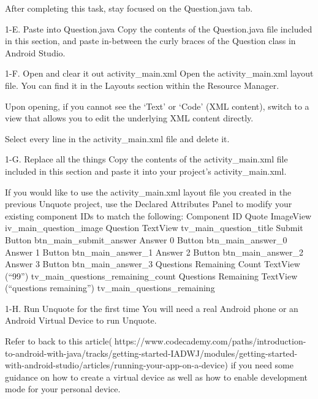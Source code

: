                 After completing this task, stay focused on the Question.java tab.

        1-E. Paste into Question.java
                Copy the contents of the Question.java file included in this section, and paste in-between the curly braces of the Question class in Android Studio.

        1-F. Open and clear it out activity_main.xml
                Open the activity_main.xml layout file. You can find it in the Layouts section within the Resource Manager.

                Upon opening, if you cannot see the ‘Text’ or ‘Code’ (XML content), switch to a view that allows you to edit the underlying XML content directly.

                Select every line in the activity_main.xml file and delete it.

        1-G. Replace all the things
                Copy the contents of the activity_main.xml file included in this section and paste it into your project’s activity_main.xml.

                If you would like to use the activity_main.xml layout file you created in the previous Unquote project, use the Declared Attributes Panel to modify your existing component IDs to match the following:
                        Component	        ID
                        Quote ImageView	        iv_main_question_image
                        Question TextView	tv_main_question_title
                        Submit Button	        btn_main_submit_answer
                        Answer 0 Button	        btn_main_answer_0
                        Answer 1 Button	        btn_main_answer_1
                        Answer 2 Button	        btn_main_answer_2
                        Answer 3 Button	        btn_main_answer_3
                        Questions Remaining Count TextView (“99”)
                                                tv_main_questions_remaining_count
                        Questions Remaining TextView (“questions remaining”)
                                                tv_main_questions_remaining
        
        1-H. Run Unquote for the first time
                You will need a real Android phone or an Android Virtual Device to run Unquote.

                Refer to back to this article(🔗https://www.codecademy.com/paths/introduction-to-android-with-java/tracks/getting-started-IADWJ/modules/getting-started-with-android-studio/articles/running-your-app-on-a-device) if you need some guidance on how to create a virtual device as well as how to enable development mode for your personal device.

